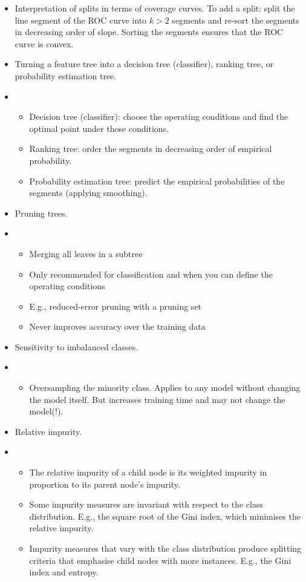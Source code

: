 \begin{itemize}
  \item Interpretation of splits in terms of coverage curves.
        To add a split: split the line segment of the ROC curve into $k > 2$ segments and re-sort the segments in decreasing order of slope.
        Sorting the segments ensures that the ROC curve is convex.
  \item Turning a feature tree into a decision tree (classifier), ranking tree, or probability estimation tree.
  \item[] \begin{itemize}
          \item Decision tree (classifier): choose the operating conditions and find the optimal point under those conditions.
          \item Ranking tree: order the segments in decreasing order of empirical probability.
          \item Probability estimation tree: predict the empirical probabilities of the segments (applying smoothing).
        \end{itemize}
  \item Pruning trees.
  \item[] \begin{itemize}
          \item Merging all leaves in a subtree
          \item Only recommended for classification and when you can define the operating conditions
          \item E.g., reduced-error pruning with a pruning set
          \item Never improves accuracy over the training data
        \end{itemize}
  \item Sensitivity to imbalanced classes.
  \item[] \begin{itemize}
          \item Oversampling the minority class.
                Applies to any model without changing the model itself.
                But increases training time and may not change the model(!).
        \end{itemize}
  \item Relative impurity.
  \item[] \begin{itemize}
          \item The relative impurity of a child node is its weighted impurity in proportion to its parent node's impurity.
          \item Some impurity measures are invariant with respect to the class distribution.
                E.g., the square root of the Gini index, which minimises the relative impurity.
          \item Impurity measures that vary with the class distribution produce splitting criteria that emphasise child nodes with more instances.
                E.g., the Gini index and entropy.
        \end{itemize}
\end{itemize}

